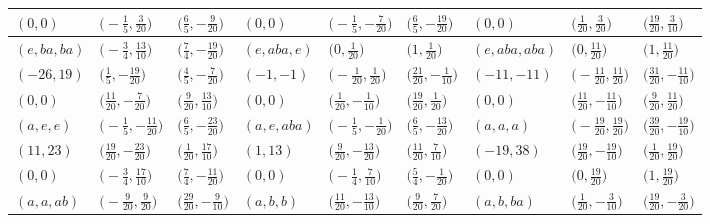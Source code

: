 \documentclass[pdftex]{sigma}
\theoremstyle{definition}
\numberwithin{equation}{section}
\begin{document}
\begin{landscape}
\begin{table}[th]
\begin{tabular}{|lll|lll|lll|}
\\
$(0, 0)$ & $\bigl(-\frac{1}{5}, \frac{3}{20}\bigr)$ & $\bigl(\frac{6}{5}, -\frac{9}{20}\bigr)$ & $(0, 0)$ & $\bigl(-\frac{1}{5}, -\frac{7}{20}\bigr)$ & $\bigl(\frac{6}{5}, -\frac{19}{20}\bigr)$ & $(0, 0)$ & $\bigl(\frac{1}{20}, \frac{3}{20}\bigr)$ & $\bigl(\frac{19}{20}, \frac{3}{10}\bigr)$
\\\hline
$(e, ba, ba)$ & $\bigl(-\frac{3}{4}, \frac{13}{10}\bigr)$ & $\bigl(\frac{7}{4}, -\frac{19}{20}\bigr)$ & $(e, aba, e)$ & $\bigl(0, \frac{1}{20}\bigr)$ & $\bigl(1, \frac{1}{20}\bigr)$ & $(e, aba, aba)$ & $\bigl(0, \frac{11}{20}\bigr)$ & $\bigl(1, \frac{11}{20}\bigr)$
\\
$(-26, 19)$ & $\bigl(\frac{1}{5}, -\frac{19}{20}\bigr)$ & $\bigl(\frac{4}{5}, -\frac{7}{20}\bigr)$ & $(-1, -1)$ & $\bigl(-\frac{1}{20}, \frac{1}{20}\bigr)$ & $\bigl(\frac{21}{20}, -\frac{1}{10}\bigr)$ & $(-11, -11)$ & $\bigl(-\frac{11}{20}, \frac{11}{20}\bigr)$ & $\bigl(\frac{31}{20}, -\frac{11}{10}\bigr)$
\\
$(0, 0)$ & $\bigl(\frac{11}{20}, -\frac{7}{20}\bigr)$ & $\bigl(\frac{9}{20}, \frac{13}{10}\bigr)$ & $(0, 0)$ & $\bigl(\frac{1}{20}, -\frac{1}{10}\bigr)$ & $\bigl(\frac{19}{20}, \frac{1}{20}\bigr)$ & $(0, 0)$ & $\bigl(\frac{11}{20}, -\frac{11}{10}\bigr)$ & $\bigl(\frac{9}{20}, \frac{11}{20}\bigr)$
\\\hline
$(a, e, e)$ & $\bigl(-\frac{1}{5}, -\frac{11}{20}\bigr)$ & $\bigl(\frac{6}{5}, -\frac{23}{20}\bigr)$ & $(a, e, aba)$ & $\bigl(-\frac{1}{5}, -\frac{1}{20}\bigr)$ & $\bigl(\frac{6}{5}, -\frac{13}{20}\bigr)$ & $(a, a, a)$ & $\bigl(-\frac{19}{20}, \frac{19}{20}\bigr)$ & $\bigl(\frac{39}{20}, -\frac{19}{10}\bigr)$
\\
$(11, 23)$ & $\bigl(\frac{19}{20}, -\frac{23}{20}\bigr)$ & $\bigl(\frac{1}{20}, \frac{17}{10}\bigr)$ & $(1, 13)$ & $\bigl(\frac{9}{20}, -\frac{13}{20}\bigr)$ & $\bigl(\frac{11}{20}, \frac{7}{10}\bigr)$ & $(-19, 38)$ & $\bigl(\frac{19}{20}, -\frac{19}{10}\bigr)$ & $\bigl(\frac{1}{20}, \frac{19}{20}\bigr)$
\\
$(0, 0)$ & $\bigl(-\frac{3}{4}, \frac{17}{10}\bigr)$ & $\bigl(\frac{7}{4}, -\frac{11}{20}\bigr)$ & $(0, 0)$ & $\bigl(-\frac{1}{4}, \frac{7}{10}\bigr)$ & $\bigl(\frac{5}{4}, -\frac{1}{20}\bigr)$ & $(0, 0)$ & $\bigl(0, \frac{19}{20}\bigr)$ & $\bigl(1, \frac{19}{20}\bigr)$
\\\hline
$(a, a, ab)$ & $\bigl(-\frac{9}{20}, \frac{9}{20}\bigr)$ & $\bigl(\frac{29}{20}, -\frac{9}{10}\bigr)$ & $(a, b, b)$ & $\bigl(\frac{11}{20}, -\frac{13}{10}\bigr)$ & $\bigl(\frac{9}{20}, \frac{7}{20}\bigr)$ & $(a, b, ba)$ & $\bigl(\frac{1}{20}, -\frac{3}{10}\bigr)$ & $\bigl(\frac{19}{20}, -\frac{3}{20}\bigr)$

\end{tabular}
\end{table}
\end{landscape}
\end{document}
